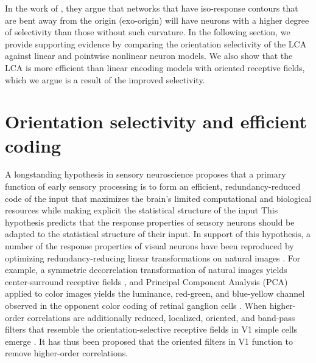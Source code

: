 In the work of \parencite{vilankar2017selectivity}, they argue that networks that have iso-response contours that are bent away from the origin (exo-origin) will have neurons with a higher degree of selectivity than those without such curvature. In the following section, we provide supporting evidence by comparing the orientation selectivity of the LCA against linear and pointwise nonlinear neuron models. We also show that the LCA is more efficient than linear encoding models with oriented receptive fields, which we argue is a result of the improved selectivity.

\section{Orientation selectivity and efficient coding}\label{sec:ch4_selectivity_efficiency}
A longstanding hypothesis in sensory neuroscience proposes that a primary function of early sensory processing is to form an efficient, redundancy-reduced code of the input that maximizes the brain's limited computational and biological resources while making explicit the statistical structure of the input \parencite{barlow2001redundancy}
This hypothesis predicts that the response properties of sensory neurons should be adapted to the statistical structure of their input.
In support of this hypothesis, a number of the response properties of visual neurons have been reproduced by optimizing redundancy-reducing linear transformations on natural images \parencite{atick1990towards}.
For example, a symmetric decorrelation transformation of natural images yields center-surround receptive fields \parencite{atick1990towards}, and Principal Component Analysis (PCA) applied to color images yields the luminance, red-green, and blue-yellow channel observed in the opponent color coding of retinal ganglion cells \parencite{ruderman1998statistics, buchsbaum1983trichromacy}.
When higher-order correlations are additionally reduced, localized, oriented, and band-pass filters that resemble the orientation-selective receptive fields in V1 simple cells emerge \parencite{bell1997independent, olshausen1997sparse}.
It has thus been proposed that the oriented filters in V1 function to remove higher-order correlations.

